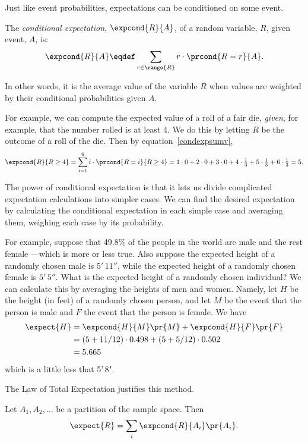 Just like event probabilities, expectations can be conditioned on some
event.
\begin{definition}\label{condexpdef} %
The \emph{conditional expectation}, $\expcond{R}{A}$, of a random
variable, $R$, given event, $A$, is:
\begin{equation}\label{condexpsumv}
\expcond{R}{A} \eqdef \sum_{r \in \range{R}} r \cdot\prcond{R=r}{A}.
\end{equation}
\end{definition}
In other words, it is the average value of the variable $R$ when values
are weighted by their conditional probabilities given $A$.

For example, we can compute the expected value of a roll of a fair die,
\emph{given}, for example, that the number rolled is at least 4.  We do
this by letting $R$ be the outcome of a roll of the die.  Then
by equation~\eqref{condexpsumv},
\[
\expcond{R}{R \geq 4} = \sum_{i=1}^6 i \cdot \prcond{R=i}{R \ge 4} 
= 1\cdot 0 + 2\cdot 0 + 3\cdot 0 + 
  4\cdot\tfrac{1}{3} + 5\cdot\tfrac{1}{3} + 6\cdot\tfrac{1}{3} 
= 5.
\]

The power of conditional expectation is that it lets us divide complicated
expectation calculations into simpler cases.  We can find the desired
expectation by calculating the conditional expectation in each simple case
and averaging them, weighing each case by its probability.

For example, suppose that 49.8\% of the people in the world are male and
the rest female ---which is more or less true.  Also suppose the expected
height of a randomly chosen male is $5'\,11''$, while the expected height
of a randomly chosen female is $5'\,5''$.  What is the expected height of a
randomly chosen individual?  We can calculate this by averaging the
heights of men and women.  Namely, let $H$ be the height (in feet) of a
randomly chosen person, and let $M$ be the event that the person is male
and $F$ the event that the person is female.  We have
\begin{align*}
\expect{H} &= \expcond{H}{M} \pr{M} + \expcond{H}{F} \pr{F}\\
&= (5 + 11/12) \cdot 0.498  + (5+ 5/12) \cdot 0.502\\
&= 5.665
\end{align*}
which is a little less that 5'\,8".

The Law of Total Expectation justifies this method.
\begin{theorem} \label{thm:condexp}
Let $A_1,A_2,\dots$ be a partition of the sample space.  Then
\[
\expect{R} = \sum_i \expcond{R}{A_i} \pr{A_i}.
\]
\end{theorem}

